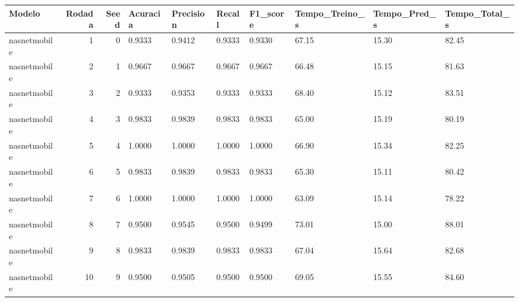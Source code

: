 \begin{tabular}{lrrlllllll}
\toprule
Modelo & Rodada & Seed & Acuracia & Precision & Recall & F1_score & Tempo_Treino_s & Tempo_Pred_s & Tempo_Total_s \\
\midrule
nasnetmobile & 1 & 0 & 0.9333 & 0.9412 & 0.9333 & 0.9330 & 67.15 & 15.30 & 82.45 \\
nasnetmobile & 2 & 1 & 0.9667 & 0.9667 & 0.9667 & 0.9667 & 66.48 & 15.15 & 81.63 \\
nasnetmobile & 3 & 2 & 0.9333 & 0.9353 & 0.9333 & 0.9333 & 68.40 & 15.12 & 83.51 \\
nasnetmobile & 4 & 3 & 0.9833 & 0.9839 & 0.9833 & 0.9833 & 65.00 & 15.19 & 80.19 \\
nasnetmobile & 5 & 4 & 1.0000 & 1.0000 & 1.0000 & 1.0000 & 66.90 & 15.34 & 82.25 \\
nasnetmobile & 6 & 5 & 0.9833 & 0.9839 & 0.9833 & 0.9833 & 65.30 & 15.11 & 80.42 \\
nasnetmobile & 7 & 6 & 1.0000 & 1.0000 & 1.0000 & 1.0000 & 63.09 & 15.14 & 78.22 \\
nasnetmobile & 8 & 7 & 0.9500 & 0.9545 & 0.9500 & 0.9499 & 73.01 & 15.00 & 88.01 \\
nasnetmobile & 9 & 8 & 0.9833 & 0.9839 & 0.9833 & 0.9833 & 67.04 & 15.64 & 82.68 \\
nasnetmobile & 10 & 9 & 0.9500 & 0.9505 & 0.9500 & 0.9500 & 69.05 & 15.55 & 84.60 \\
\bottomrule
\end{tabular}
